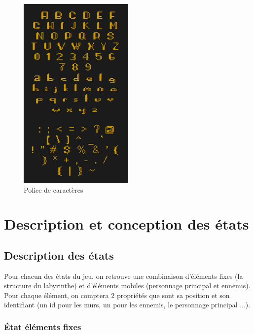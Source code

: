 \documentclass[a4paper,12pt]{article}
\begin{document}
\begin{figure}[h]
\begin{center}
\includegraphics[width=0.5\textwidth]{font.png}
\caption{\label{font}Police de caractères}
\end{center}
\end{figure}

\clearpage
\section{Description et conception des états}

\subsection{Description des états}

Pour chacun des états du jeu, on retrouve une combinaison d'éléments fixes (la structure du labyrinthe) et d'éléments mobiles (personnage principal et ennemis).
Pour chaque élément, on comptera 2 propriétés que sont sa position et son identifiant (un id pour les murs, un pour les ennemis, le personnage principal ...).

\subsubsection{État éléments fixes}
\end{document}
